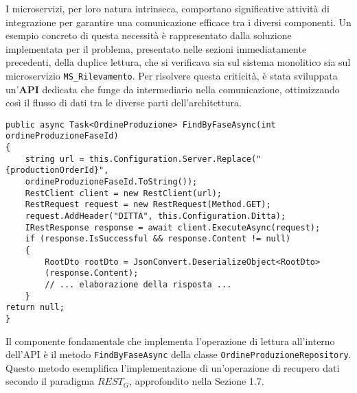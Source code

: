        \vspace{0.2 em}
        \noindent I microservizi, per loro natura intrinseca, comportano significative attività di integrazione per garantire una comunicazione efficace tra i diversi componenti. Un esempio concreto di questa necessità è rappresentato dalla soluzione implementata per il problema, presentato nelle sezioni immediatamente precedenti, della duplice lettura, che si verificava sia sul sistema monolitico sia sul microservizio \texttt{MS\_Rilevamento}. Per risolvere questa criticità, è stata sviluppata un'\textbf{API} dedicata che funge da intermediario nella comunicazione, ottimizzando così il flusso di dati tra le diverse parti dell'architettura.

\begin{verbatim}
public async Task<OrdineProduzione> FindByFaseAsync(int ordineProduzioneFaseId)
{
    string url = this.Configuration.Server.Replace("{productionOrderId}", 
    ordineProduzioneFaseId.ToString());
    RestClient client = new RestClient(url);
    RestRequest request = new RestRequest(Method.GET);
    request.AddHeader("DITTA", this.Configuration.Ditta);
    IRestResponse response = await client.ExecuteAsync(request);
    if (response.IsSuccessful && response.Content != null)
    {
        RootDto rootDto = JsonConvert.DeserializeObject<RootDto>
        (response.Content);
        // ... elaborazione della risposta ...
    }
return null;
}
\end{verbatim}

        \vspace{0.2 em}
        \noindent Il componente fondamentale che implementa l'operazione di lettura all'interno dell'API è il metodo \texttt{FindByFaseAsync} della classe \texttt{OrdineProduzioneRepository}. Questo metodo esemplifica l'implementazione di un'operazione di recupero dati secondo il paradigma $REST_G$, approfondito nella Sezione 1.7.

